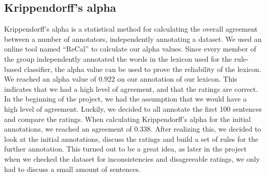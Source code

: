 \subsection{Krippendorff’s alpha}
Krippendorff’s alpha is a statistical method for calculating the overall agreement between a number of annotators, independently annotating a dataset. 
We used an online tool named “ReCal” \cite{ReCal} to calculate our alpha values.
Since every member of the group independently annotated the words in the lexicon used for the rule-based classifier, the alpha value can be used to prove the reliability of the lexicon.
We reached an alpha value of 0.922 on our annotation of our lexicon. This indicates that we had a high level of agreement, and that the ratings are correct.
In the beginning of the project, we had the assumption that we would have a high level of agreement. Luckily, we decided to all annotate the first 100 sentences and compare the ratings.
When calculating Krippendorff’s alpha for the initial annotations, we reached an agreement of 0.338. After realizing this, we decided to look at the initial annotations, discuss the ratings and build a set of rules for the further annotation.
This turned out to be a great idea, as later in the project when we checked the dataset for inconsistencies and disagreeable ratings, we only had to discuss a small amount of sentences.


